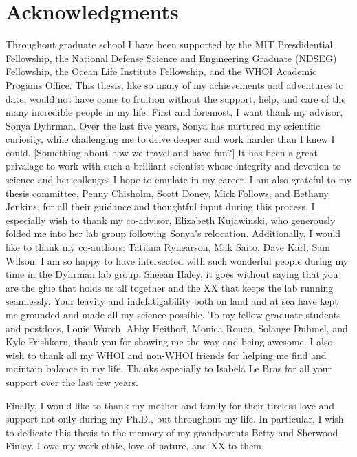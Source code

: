 % 

\cleardoublepage

\section*{Acknowledgments}

Throughout graduate school I have been supported by the MIT Presdidential Fellowship, the National Defense Science and Engineering Graduate (NDSEG) Fellowship, the Ocean Life Institute Fellowship, and the WHOI Academic Progams Office. 
This thesis, like so many of my achievements and adventures to date, would not have come to fruition without the support, help, and care of the many incredible people in my life. 
First and foremost, I want thank my advisor, Sonya Dyhrman. Over the last five years, Sonya has nurtured my scientific curiosity, while challenging me to delve deeper and work harder than I knew I could. [Something about how we travel and have fun?] It has been a great privalage to work with such a brilliant scientist whose integrity and devotion to science and her colleuges I hope to emulate in my career. 
I am also grateful to my thesis committee, Penny Chisholm, Scott Doney, Mick Follows, and Bethany Jenkins, for all their guidance and thoughtful input during this process. I especially wish to thank my co-advisor, Elizabeth Kujawinski, who generously folded me into her lab group following Sonya's relocation. Additionally, I would like to thank my co-authors: Tatiana Rynearson, Mak Saito, Dave Karl, Sam Wilson. 
I am so happy to have intersected with such wonderful people during my time in the Dyhrman lab group. Sheean Haley, it goes without saying that you are the glue that holds us all together and the XX that keeps the lab running seamlessly. Your leavity and indefatigability both on land and at sea have kept me grounded and made all my science possible. To my fellow graduate students and postdocs, Louie Wurch, Abby Heithoff, Monica Rouco, Solange Duhmel, and Kyle Frishkorn, thank you for showing me the way and being awesome. I also wish to thank all my WHOI and non-WHOI friends for helping me find and maintain balance in my life. Thanks especially to Isabela Le Bras for all your support over the last few years. 

Finally, I would like to thank my mother and family for their tireless love and support not only during my Ph.D., but throughout my life. In particular, I wish to dedicate this thesis to the memory of my grandparents Betty and Sherwood Finley. I owe my work ethic, love of nature, and XX to them. 
